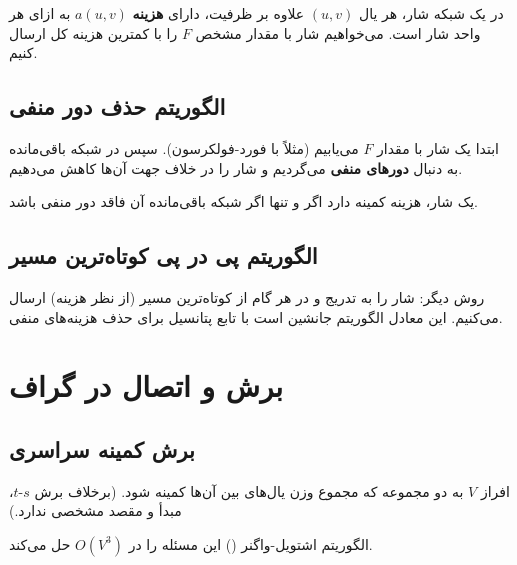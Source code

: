 \documentclass{matinbook}
\begin{document}
    \begin{definition}
        در یک شبکه شار، هر یال $(u, v)$ علاوه بر ظرفیت،
        دارای \textbf{هزینه} $a(u, v)$ به ازای هر واحد
        شار است. می‌خواهیم شار با مقدار مشخص $F$ را
        با کمترین هزینه کل ارسال کنیم.
        \label{def:min-cost-flow}
    \end{definition}
    
    \subsection{الگوریتم حذف دور منفی}
    
    ابتدا یک شار با مقدار $F$ می‌یابیم (مثلاً با
    فورد-فولکرسون). سپس در شبکه باقی‌مانده
    به دنبال \textbf{دورهای منفی} می‌گردیم
    و شار را در خلاف جهت آن‌ها کاهش می‌دهیم.
    
    \begin{theorem}
        یک شار، هزینه کمینه دارد اگر و تنها اگر
        شبکه باقی‌مانده آن فاقد دور منفی باشد.
        \label{thm:negative-cycle-optimality}
    \end{theorem}
    
    \subsection{الگوریتم پی در پی کوتاه‌ترین مسیر}
    
    روش دیگر: شار را به تدریج و در هر گام
    از کوتاه‌ترین مسیر (از نظر هزینه) ارسال می‌کنیم.
    این معادل الگوریتم جانشین است با تابع
    پتانسیل برای حذف هزینه‌های منفی.
    
    \section{برش و اتصال در گراف}
    
    \subsection{برش کمینه سراسری}
    
    \begin{definition}
        افراز $V$ به دو مجموعه که مجموع وزن
        یال‌های بین آن‌ها کمینه شود.
        (برخلاف برش $s$-$t$، مبدأ و مقصد مشخصی ندارد.)
        \label{def:global-min-cut}
    \end{definition}
    
    الگوریتم اشتویل-واگنر ()
    این مسئله را در $O(V^{3})$ حل می‌کند.
    
\end{document}
